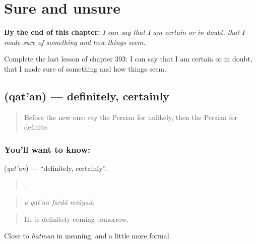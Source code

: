 
\chapter{Sure and unsure}
\label{ch:fa-sure-and-unsure}

\begin{chapteropening}
\textbf{By the end of this chapter:} \emph{I can say that I am certain or in doubt, that I made sure of something and how things seem.}

Complete the last lesson of chapter 393: I can say that I am certain or in doubt, that I made sure of something and how things seem.
\end{chapteropening}

\section[\texorpdfstring{\fa{قطعا} (qat'an)}{قطعا (qat'an)}]{ (qat'an) — definitely, certainly}

\label{lesson:FA-C393-qatan}



\begin{quote}
Before the new one: say the Persian for unlikely, then the Persian for definite.
\end{quote}

\subsection*{You'll want to know: }
\textbf{} (\emph{qat'an}) — \textquotedblleft{}definitely, certainly\textquotedblright{}.

\begin{quote}
   .
\end{quote}

\begin{quote}
\emph{u qat'an fardâ miâyad.}
\end{quote}

\begin{quote}
He is definitely coming tomorrow.
\end{quote}

Close to \emph{hatman} in meaning, and a little more formal.


